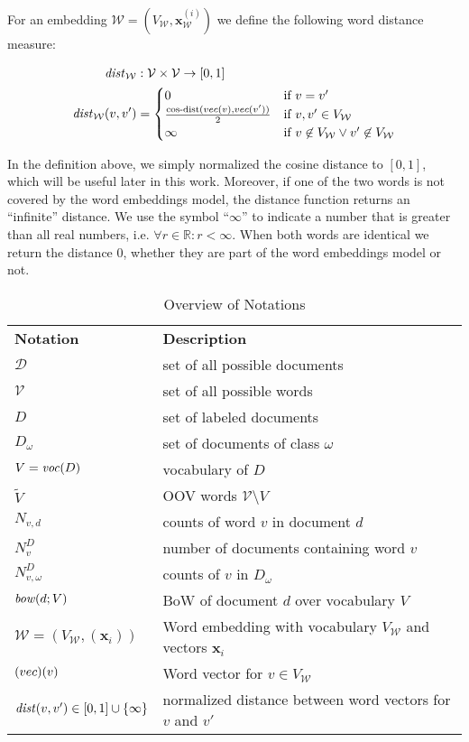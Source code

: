 For an embedding $\mathcal{W}=(V_{\mathcal{W}}, \mathbf{x}_\mathcal{W}^{(i)})$ we define the
following word distance measure:

\begin{equation*}
\begin{split}
\mathit{dist}_\mathcal{W} &: \mathcal{V}\times \mathcal{V} \to [0,1] \\
\mathit{dist}_\mathcal{W}(v,v') &= \begin{cases} 0 & \text{if~} v=v' \\
\frac{\mathit{\text{cos-dist}}(vec(v),vec(v'))}{2} & \text{if~} v,v' \in
V_{\mathcal{W}}
\\
\infty & \text{if~} v \not\in V_{\mathcal{W}} \lor v' \not\in V_{\mathcal{W}}
\end{cases}
\end{split}
\end{equation*}

In the definition above, we simply normalized the cosine distance to $[0,1]$,
which will be useful later in this work. Moreover, if one of the two words
is not covered by the word embeddings model, the distance function
returns an ``infinite'' distance. We use the symbol ``$\infty$''
to indicate a number that is greater than all real numbers, i.e. $\forall r
\in\mathbb{R}: r < \infty$. When both words are identical we
return the distance $0$, whether they are part of the word embeddings model or
not.

\begin{table}
\centering
\begin{tabular}{|l|l|}
\textbf{Notation} & \textbf{Description}  \\

$\mathcal{D}$ & set of all possible documents \\
$\mathcal{V}$ & set of all possible words  \\
$D$ & set of labeled documents \\
$D_\omega$ & set of documents of class $\omega$ \\ 
$V = \mathit{voc}(D)$ & vocabulary of $D$ \\
$\tilde{V}$ & OOV words $\mathcal{V} \setminus V$ \\
$N_{v,d}$ & counts of word $v$ in document $d$ \\
$N_v^D$ & number of documents containing word $v$ \\ 
$N_{v,\omega}^D$ & counts of $v$ in $D_\omega$ \\
$\mathit{bow}(d; V)$ & BoW of document $d$ over vocabulary $V$ \\
$\mathcal{W}=(V_\mathcal{W}, (\mathbf{x}_i))$ & Word embedding with vocabulary $V_\mathcal{W}$ and vectors $\mathbf{x}_i$ \\
$\mathit{(}vec)(v)$ & Word vector for $v \in V_\mathcal{W}$ \\
$\mathit{dist}(v,v') \in [0,1]\cup \{\infty\}$ & normalized distance between word vectors for $v$ and $v'$ \\ 

\end{tabular}
\caption{Overview of Notations}
\label{tab:notations}
\end{table}

